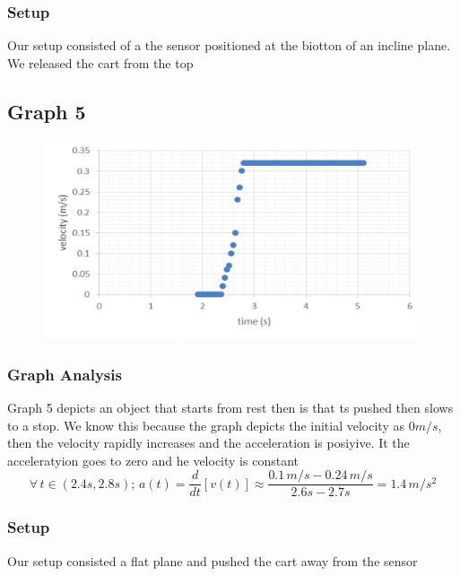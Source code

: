 \documentclass[11pt, letterpaper, includehead]{article}
\begin{document}
  \subsubsection{Setup}
  Our setup consisted of a the sensor positioned at the biotton of an incline plane. We released the cart from the top 

  \subsection{Graph 5}

  \begin{figure}[H] %
    \centering 
    \includegraphics[width=\linewidth]{graph_5.png}
  \end{figure}

  \subsubsection{Graph Analysis}
  Graph 5 depicts an object that starts from rest then is that ts pushed then slows to a stop. 
  We know this because the graph depicts the initial velocity as $0m/s$, then the velocity rapidly 
  increases and the acceleration is posiyive. It the acceleratyion goes to zero and he velocity is constant
  $$\forall \, t \in (2.4s, 2.8s); \, a(t) = \frac{d}{dt}[v(t)] \approx \frac{0.1 \, m/s - 0.24 \, m/s}{2.6s - 2.7s} = 1.4 \, m/s^2$$


  \subsubsection{Setup}
  Our setup consisted a flat plane and pushed the cart away from the sensor


\end{document}
